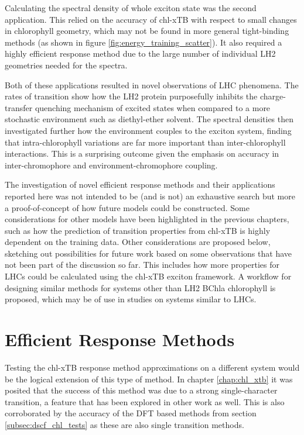 Calculating the spectral density of whole exciton state was the second application.
This relied on the accuracy of chl-xTB with respect to small changes in chlorophyll
geometry, which may not be found in more general tight-binding methods (as shown
in figure \ref{fig:energy_training_scatter}). It also required a highly efficient
response method due to the large number of individual LH2 geometries needed for 
the spectra.

Both of these applications resulted in novel observations of LHC phenomena. The
rates of transition show how the LH2 protein purposefully inhibits the charge-transfer
quenching mechanism of excited states when compared to a more stochastic environment
such as diethyl-ether solvent. The spectral densities then investigated further 
how the environment couples to the exciton system, finding that intra-chlorophyll
variations are far more important than inter-chlorophyll interactions. This is a
surprising outcome given the emphasis on accuracy in inter-chromophore and environment-chromophore
coupling.

The investigation of novel efficient response methods and their applications reported
here was not intended to be (and is not) an exhaustive search but more a proof-of-concept
of how future models could be constructed. Some considerations for other models 
have been highlighted in the previous chapters, such as how the prediction of transition
properties from chl-xTB is highly dependent on the training data. Other considerations
are proposed below, sketching out possibilities for future work based on some observations
that have not been part of the discussion so far. This includes how more properties 
for LHCs could be calculated using the chl-xTB exciton framework. A workflow for
designing similar methods for systems other than LH2 BChla chlorophyll is proposed,
which may be of use in studies on systems similar to LHCs.

\section{Efficient Response Methods}
\label{sec:future_response_methods}

Testing the chl-xTB response method approximations on a different system would be
the logical extension of this type of method. In chapter \ref{chap:chl_xtb} it was
posited that the success of this method was due to a strong single-character transition,
a feature that has been explored in other work as well. This is also corroborated 
by the accuracy of the DFT based \dscf methods from section \ref{subsec:dscf_chl_tests}
as these are also single transition methods.

